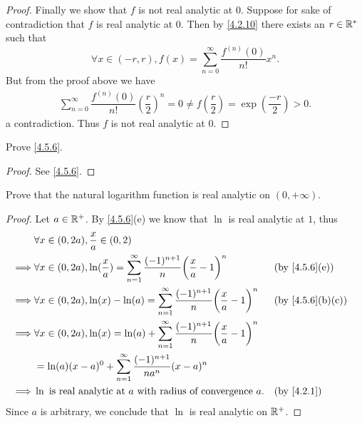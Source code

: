 \begin{proof}
  Finally we show that \(f\) is not real analytic at \(0\).
  Suppose for sake of contradiction that \(f\) is real analytic at \(0\).
  Then by \cref{4.2.10} there exists an \(r \in \mathbb{R}^*\) such that
  \[
    \forall x \in (-r, r), f(x) = \sum_{n = 0}^\infty \dfrac{f^{(n)}(0)}{n!} x^n.
  \]
  But from the proof above we have
  \begin{align*}
    \sum_{n = 0}^\infty \dfrac{f^{(n)}(0)}{n!} (\dfrac{r}{2})^n = 0 \neq f(\dfrac{r}{2}) = \exp(\dfrac{-r}{2}) > 0.
  \end{align*}
  a contradiction.
  Thus \(f\) is not real analytic at \(0\).
\end{proof}

\begin{ex}\label{ex:4.5.5}
  Prove \cref{4.5.6}.
\end{ex}

\begin{proof}
  See \cref{4.5.6}.
\end{proof}

\begin{ex}\label{ex:4.5.6}
  Prove that the natural logarithm function is real analytic on \((0, +\infty)\).
\end{ex}

\begin{proof}
  Let \(a \in \mathbb{R}^+\).
  By \cref{4.5.6}(e) we know that \(\ln\) is real analytic at \(1\), thus
  \begin{align*}
             & \forall x \in (0, 2a), \dfrac{x}{a} \in (0, 2)                                                                                                            \\
    \implies & \forall x \in (0, 2a), \ln(\dfrac{x}{a}) = \sum_{n = 1}^\infty \dfrac{(-1)^{n + 1}}{n} \bigg(\dfrac{x}{a} - 1\bigg)^n &  & \text{(by \cref{4.5.6}(e))}    \\
    \implies & \forall x \in (0, 2a), \ln(x) - \ln(a) = \sum_{n = 1}^\infty \dfrac{(-1)^{n + 1}}{n} \bigg(\dfrac{x}{a} - 1\bigg)^n   &  & \text{(by \cref{4.5.6}(b)(c))} \\
    \implies & \forall x \in (0, 2a), \ln(x) = \ln(a) + \sum_{n = 1}^\infty \dfrac{(-1)^{n + 1}}{n} \bigg(\dfrac{x}{a} - 1\bigg)^n                                       \\
             & = \ln(a) (x - a)^0 + \sum_{n = 1}^\infty \dfrac{(-1)^{n + 1}}{n a^n} (x - a)^n                                                                            \\
    \implies & \ln \text{ is real analytic at } a \text{ with radius of convergence } a.                                             &  & \by{4.2.1}
  \end{align*}
  Since \(a\) is arbitrary, we conclude that \(\ln\) is real analytic on \(\mathbb{R}^+\).
\end{proof}


